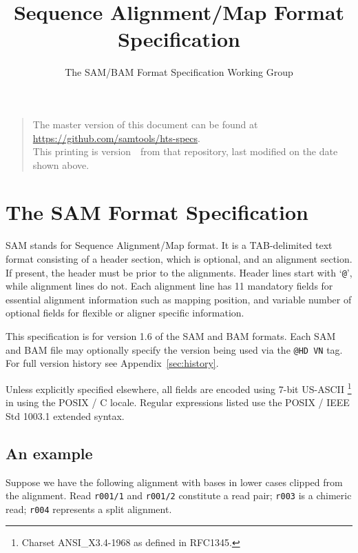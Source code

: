 \documentclass[10pt]{article}
\begin{document}

\title{Sequence Alignment/Map Format Specification}
\author{The SAM/BAM Format Specification Working Group}
\date{\headdate}
\maketitle
\begin{quote}\small
The master version of this document can be found at
\url{https://github.com/samtools/hts-specs}.\\
This printing is version~\commitdesc\ from that repository,
last modified on the date shown above.
\end{quote}
\vspace*{1em}


\section{The SAM Format Specification}
SAM stands for Sequence Alignment/Map format. It is a TAB-delimited text
format consisting of a header section, which is optional, and an
alignment section. If present, the header must be prior to the
alignments. Header lines start with `{\tt @}', while alignment lines do
not. Each alignment line has 11 mandatory fields for essential alignment
information such as mapping position, and variable number of optional
fields for flexible or aligner specific information.

This specification is for version 1.6 of the SAM and BAM formats.  Each SAM and
BAM file may optionally specify the version being used via the
{\tt @HD VN} tag. For full version history see Appendix~\ref{sec:history}. 

Unless explicitly specified elsewhere, all fields are encoded using 7-bit US-ASCII \footnote{Charset ANSI\_X3.4-1968 as defined in RFC1345.} in using the POSIX / C locale.
Regular expressions listed use the POSIX / IEEE Std 1003.1 extended syntax.

\subsection{An example}\label{sec:example}
Suppose we have the following alignment with bases in lower cases
clipped from the alignment. Read {\tt r001/1} and {\tt r001/2}
constitute a read pair; {\tt r003} is a chimeric read; {\tt r004}
represents a split alignment.
\end{document}
